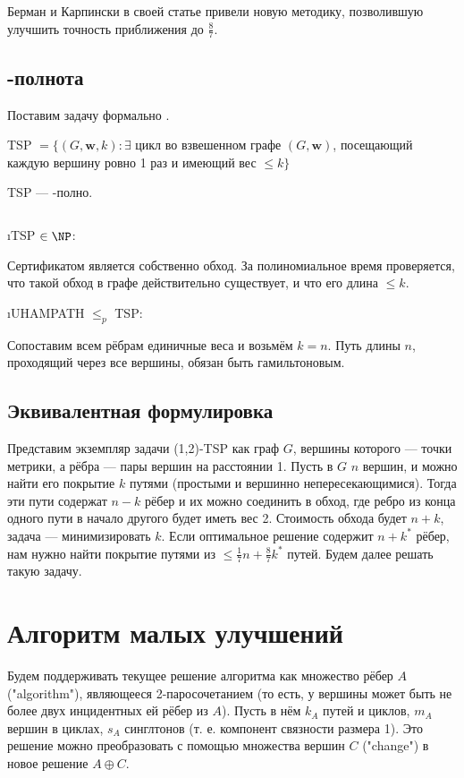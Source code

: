 Берман и Карпински в своей статье \cite{BK06} привели новую методику, позволившую улучшить точность приближения до $\frac{8}{7}$.

\subsection{\NP-полнота}
Поставим задачу формально .

TSP $= \{ (G, \mathbf{w}, k): \exists$ цикл во взвешенном графе $(G, \mathbf{w})$, посещающий каждую вершину ровно 1 раз и имеющий вес $\le k \}$

\begin{theorem}
	TSP --- \NP-полно.
\end{theorem}
\begin{Proof}
 $ $
 
 \begin{itemize}
  \i TSP $\in \NP$\cite{BA09}:
 
  Сертификатом является собственно обход. За полиномиальное время проверяется, что такой обход в графе действительно существует, и что его длина $\le k$.
 
  \i UHAMPATH $\le_p$ TSP: \cite{M17}
 
  Сопоставим всем рёбрам единичные веса и возьмём $k = n$. Путь длины $n$, проходящий через все вершины, обязан быть гамильтоновым.
 \end{itemize}
\end{Proof}

\subsection{Эквивалентная формулировка}
Представим экземпляр задачи (1,2)-TSP как граф $G$, вершины которого --- точки метрики, а рёбра --- пары вершин на расстоянии 1. Пусть в $G$ $n$ вершин, и можно найти его покрытие $k$ путями (простыми и вершинно непересекающимися). Тогда эти пути содержат $n-k$ рёбер и их можно соединить в обход, где ребро из конца одного пути в начало другого будет иметь вес 2. Стоимость обхода будет $n+k$, задача --- минимизировать $k$. Если оптимальное решение содержит $n+k^*$ рёбер, нам нужно найти покрытие путями из $\le \frac{1}{7}n+\frac{8}{7}k^*$ путей. Будем далее решать такую задачу.

\section{Алгоритм малых улучшений}
Будем поддерживать текущее решение алгоритма как множество рёбер $A$ ("algorithm"), являющееся 2-паросочетанием (то есть, у вершины может быть не более двух инцидентных ей рёбер из $A$). Пусть в нём $k_A$ путей и циклов, $m_A$ вершин в циклах, $s_A$ синглтонов (т. е. компонент связности размера 1). Это решение можно преобразовать с помощью множества вершин $C$ ("change") в новое решение $A \oplus C$. 

